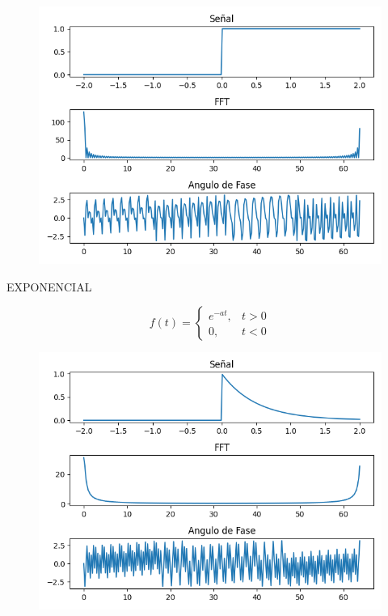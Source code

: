 \documentclass[
	12pt, %
]{fphw}
\begin{document}
\begin{figure}[H]
  \centering
  \includegraphics[scale=0.8]{images/escalon_unitario.png}
\end{figure}

\newpage

{\color{teal}
  \dotfill
  EXPONENCIAL
\dotfill}

\[f(t) =\left\{ \begin{array}{lr} e^{-at}, & t > 0 \\0, & t < 0 \end{array}\right.\]

\begin{figure}[H]
  \centering
  \includegraphics[scale=0.8]{images/exponencial.png}
\end{figure}
\end{document}
